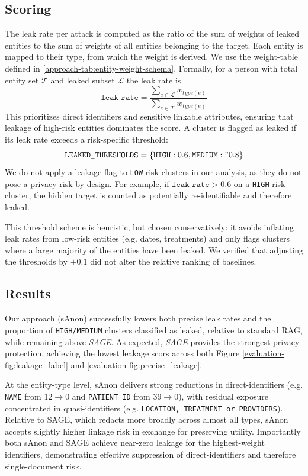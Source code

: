 \subsection{Scoring}
The leak rate per attack is computed as the ratio of the sum of weights of leaked entities to the sum of weights of all entities belonging to the target. Each entity is mapped to their type, from which the weight is derived. We use the weight-table defined in \ref{approach-tab:entity-weight-schema}. Formally, for a person with total entity set $\mathcal{T}$ and leaked subset $\mathcal{L}$ the leak rate is
\[
  \texttt{leak\_rate} = \frac{\sum_{e\in \mathcal{L}} w_{type(e)}}{\sum_{e \in \mathcal{T}} w_{type(e)}}
\]
This  prioritizes direct identifiers and sensitive linkable attributes, ensuring that leakage of high-risk entities dominates the score. A cluster is flagged as leaked if its leak rate exceeds a risk-specific threshold:
\[
\texttt{LEAKED\_THRESHOLDS} = \{\texttt{HIGH}: 0.6, \texttt{MEDIUM}:" 0.8\}
\]
We do not apply a leakage flag to \texttt{LOW}-risk clusters in our analysis, as they do not pose a privacy risk by design. For example, if $\texttt{leak\_rate} > 0.6$ on a \texttt{HIGH}-risk cluster, the hidden target is counted as potentially re-identifiable and therefore leaked.

This threshold scheme is heuristic, but chosen conservatively: it avoids inflating leak rates from low-risk entities (e.g. dates, treatments) and only flags clusters where a large majority of the entities have been leaked. We verified that adjusting the thresholds by $\pm 0.1$ did not alter the relative ranking of baselines.

\subsection{Results}
Our approach (sAnon) successfully lowers both precise leak rates  and the proportion of \texttt{HIGH/MEDIUM} clusters classified as leaked, relative to standard RAG, while remaining above \textit{SAGE}. As expected, \textit{SAGE} provides the strongest privacy protection, achieving the lowest leakage scors across both Figure \ref{evaluation-fig:leakage_label} and \ref{evaluation-fig:precise_leakage}. 

At the entity-type level, sAnon delivers strong reductions in direct-identifiers (e.g. \texttt{NAME} from 12$\rightarrow$0 and \texttt{PATIENT\_ID} from 39$\rightarrow$0), with residual exposure concentrated in quasi-identifiers (e.g. \texttt{LOCATION, TREATMENT or PROVIDERS}). Relative to SAGE, which redacts more broadly across almost all types, sAnon accepts slightly higher linkage risk in exchange for preserving utility. Importantly both sAnon and SAGE achieve near-zero leakage for the highest-weight identifiers, demonstrating effective suppression of direct-identifiers and therefore single-document risk. 

